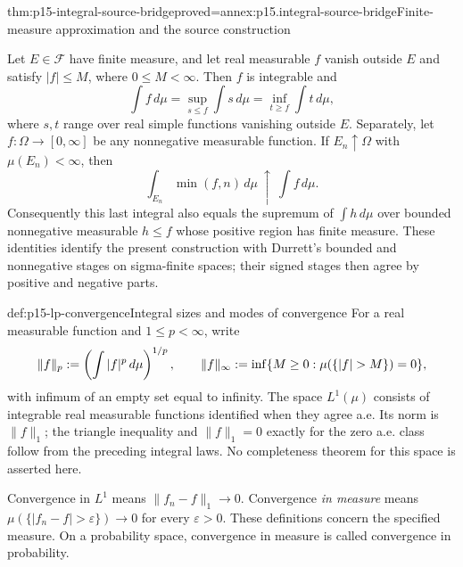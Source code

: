 \begin{hbtheorem}{thm:p15-integral-source-bridge}{proved=annex:p15.integral-source-bridge}{Finite-measure approximation and the source construction}
\par\nobreak
Let \(E\in\mathcal F\) have finite measure, and let real measurable
\(f\) vanish outside \(E\) and satisfy \(|f|\leq M\), where \(0\leq M<\infty\).
Then \(f\) is integrable and
\[
 \int f\,d\mu
 =\sup_{s\leq f}\int s\,d\mu
 =\inf_{t\geq f}\int t\,d\mu,
\]
where \(s,t\) range over real simple functions vanishing outside \(E\).
Separately, let \(f:\Omega\to[0,\infty]\) be any nonnegative
measurable function. If \(E_n\uparrow\Omega\) with
\(\mu(E_n)<\infty\), then
\[
 \int_{E_n}\min(f,n)\,d\mu\ \uparrow\ \int f\,d\mu.
\]
Consequently this last integral also equals the supremum of
\(\int h\,d\mu\) over bounded nonnegative measurable \(h\leq f\)
whose positive region has finite measure. These identities identify the
present construction with Durrett's bounded and nonnegative stages on
sigma-finite spaces; their signed stages then agree by positive and
negative parts.
\end{hbtheorem}

\begin{hbdefinition}{def:p15-lp-convergence}{Integral sizes and modes of convergence}
For a real measurable function and \(1\leq p<\infty\), write
\[
 \|f\|_p\defeq\left(\int|f|^p\,d\mu\right)^{1/p},\qquad
 \|f\|_\infty\defeq
 \inf\{M\geq0:\mu(\{|f|>M\})=0\},
\]
with infimum of an empty set equal to infinity. The space \(L^1(\mu)\)
consists of integrable real measurable functions identified when they
agree a.e. Its norm is \(\|f\|_1\); the triangle inequality and
\(\|f\|_1=0\) exactly for the zero a.e. class follow from the
preceding integral laws. No completeness theorem for this space is
asserted here.

Convergence in \(L^1\) means \(\|f_n-f\|_1\to0\).
Convergence \emph{in measure} means
\(\mu(\{|f_n-f|>\varepsilon\})\to0\) for every \(\varepsilon>0\).
These definitions concern the specified measure. On a probability space,
convergence in measure is called convergence in probability.
\end{hbdefinition}

